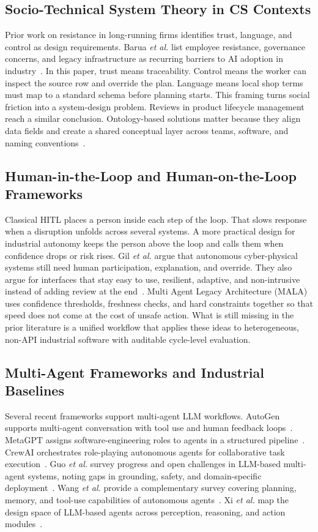 \documentclass[conference]{IEEEtran}
\newcommand{\MALA}{Multi Agent Legacy Architecture (MALA)}
\begin{document}
\subsection{Socio-Technical System Theory in CS Contexts}

Prior work on resistance in long-running firms identifies trust, language, and control as design requirements. Barua \emph{et al.} list employee resistance, governance concerns, and legacy infrastructure as recurring barriers to AI adoption in industry~\cite{barua2025}. In this paper, trust means traceability. Control means the worker can inspect the source row and override the plan. Language means local shop terms must map to a standard schema before planning starts. This framing turns social friction into a system-design problem. Reviews in product lifecycle management reach a similar conclusion. Ontology-based solutions matter because they align data fields and create a shared conceptual layer across teams, software, and naming conventions~\cite{fogliatto2020}.

\subsection{Human-in-the-Loop and Human-on-the-Loop Frameworks}

Classical HITL places a person inside each step of the loop. That slows response when a disruption unfolds across several systems. A more practical design for industrial autonomy keeps the person above the loop and calls them when confidence drops or risk rises. Gil \emph{et al.} argue that autonomous cyber-physical systems still need human participation, explanation, and override. They also argue for interfaces that stay easy to use, resilient, adaptive, and non-intrusive instead of adding review at the end~\cite{ribeiro2019}. \MALA{} uses confidence thresholds, freshness checks, and hard constraints together so that speed does not come at the cost of unsafe action. What is still missing in the prior literature is a unified workflow that applies these ideas to heterogeneous, non-API industrial software with auditable cycle-level evaluation.

\subsection{Multi-Agent Frameworks and Industrial Baselines}

Several recent frameworks support multi-agent LLM workflows. AutoGen supports multi-agent conversation with tool use and human feedback loops~\cite{wu2023autogen}. MetaGPT assigns software-engineering roles to agents in a structured pipeline~\cite{hong2024metagpt}. CrewAI orchestrates role-playing autonomous agents for collaborative task execution~\cite{moura2024crewai}. Guo \emph{et al.} survey progress and open challenges in LLM-based multi-agent systems, noting gaps in grounding, safety, and domain-specific deployment~\cite{guo2024survey}. Wang \emph{et al.} provide a complementary survey covering planning, memory, and tool-use capabilities of autonomous agents~\cite{wang2024agents}. Xi \emph{et al.} map the design space of LLM-based agents across perception, reasoning, and action modules~\cite{xi2023agents}.
\end{document}
